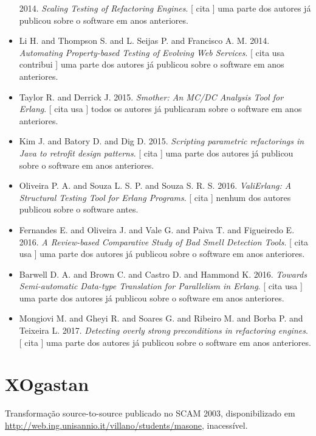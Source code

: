 \begin{itemize}
      2014.
        \textit{ Scaling Testing of Refactoring Engines}.
      [
          cita
      ]
uma parte dos autores já publicou sobre o software em anos anteriores.
\item Li H. and Thompson S. and L. Seijas P. and Francisco A. M.
      2014.
        \textit{ Automating Property-based Testing of Evolving Web Services}.
      [
          cita
          usa
          contribui
      ]
uma parte dos autores já publicou sobre o software em anos anteriores.
\item Taylor R. and Derrick J.
      2015.
        \textit{ Smother: An MC/DC Analysis Tool for Erlang}.
      [
          cita
          usa
      ]
todos os autores já publicaram sobre o software em anos anteriores.
\item Kim J. and Batory D. and Dig D.
      2015.
        \textit{ Scripting parametric refactorings in Java to retrofit design patterns}.
      [
          cita
      ]
uma parte dos autores já publicou sobre o software em anos anteriores.
\item Oliveira P. A. and Souza L. S. P. and Souza S. R. S.
      2016.
        \textit{ ValiErlang: A Structural Testing Tool for Erlang Programs}.
      [
          cita
      ]
nenhum dos autores publicou sobre o software antes.
\item Fernandes E. and Oliveira J. and Vale G. and Paiva T. and Figueiredo E.
      2016.
        \textit{ A Review-based Comparative Study of Bad Smell Detection Tools}.
      [
          cita
          usa
      ]
uma parte dos autores já publicou sobre o software em anos anteriores.
\item Barwell D. A. and Brown C. and Castro D. and Hammond K.
      2016.
        \textit{ Towards Semi-automatic Data-type Translation for Parallelism in Erlang}.
      [
          cita
          usa
      ]
uma parte dos autores já publicou sobre o software em anos anteriores.
\item Mongiovi M. and Gheyi R. and Soares G. and Ribeiro M. and Borba P. and Teixeira L.
      2017.
        \textit{ Detecting overly strong preconditions in refactoring engines}.
      [
          cita
      ]
uma parte dos autores já publicou sobre o software em anos anteriores.
\end{itemize}
\section{XOgastan}

Transformação source-to-source
publicado no SCAM 2003,
disponibilizado em \url{http://web.ing.unisannio.it/villano/students/masone},
inacessível.

